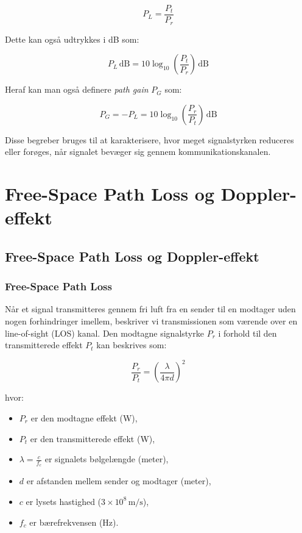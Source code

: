 \documentclass[a4paper,12pt]{book}
\begin{document}
	\[
	P_L = \frac{P_t}{P_r}
	\]
	
	\noindent Dette kan også udtrykkes i dB som:
	
	\[
	P_L \, \text{dB} = 10 \log_{10} \left( \frac{P_t}{P_r} \right) \, \text{dB}
	\]
	
	\noindent Heraf kan man også definere \textit{path gain} \( P_G \) som:
	
	\[
	P_G = -P_L = 10 \log_{10} \left( \frac{P_r}{P_t} \right) \, \text{dB}
	\]
	
	\noindent Disse begreber bruges til at karakterisere, hvor meget signalstyrken reduceres eller forøges, når signalet bevæger sig gennem kommunikationskanalen.
	
	\chapter{Free-Space Path Loss og Doppler-effekt}
	\label{cha:Free-Space Path Loss og Doppler-effekt}
	\section{Free-Space Path Loss og Doppler-effekt}
	
	\subsection{Free-Space Path Loss}
	Når et signal transmitteres gennem fri luft fra en sender til en modtager uden nogen forhindringer imellem, beskriver vi transmissionen som værende over en line-of-sight (LOS) kanal. Den modtagne signalstyrke \( P_r \) i forhold til den transmitterede effekt \( P_t \) kan beskrives som:
	
	\[
	\frac{P_r}{P_t} = \left( \frac{\lambda}{4\pi d} \right)^2
	\]
	
	hvor:
	\begin{itemize}
		\item \( P_r \) er den modtagne effekt (W),
		\item \( P_t \) er den transmitterede effekt (W),
		\item \( \lambda = \frac{c}{f_c} \) er signalets bølgelængde (meter),
		\item \( d \) er afstanden mellem sender og modtager (meter),
		\item \( c \) er lysets hastighed (\(3 \times 10^8 \, \text{m/s}\)),
		\item \( f_c \) er bærefrekvensen (Hz).
	\end{itemize}
	
\end{document}
